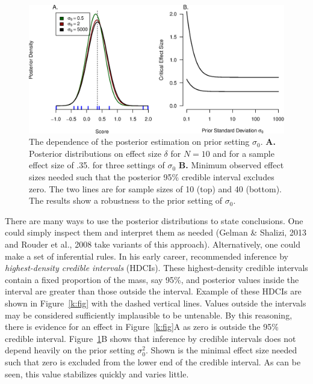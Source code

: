 \begin{figure}
\includegraphics[width=\textwidth]{figs/bi4_fig2}
\caption{The dependence of the posterior estimation on prior setting $\sigma_0$.  \textbf{A.} Posterior distributions on effect size $\delta$ for $N=10$ and for a sample effect size of .35. for three settings of $\sigma_0$ \textbf{B.} Minimum observed effect sizes needed such that the posterior 95\% credible interval excludes zero.  The two lines are for sample sizes of 10 (top) and 40 (bottom).  The results show a robustness to the prior setting of $\sigma_0$. }
\label{sig0}
\end{figure}

There are many ways to use the posterior distributions to state conclusions.  One could simply inspect them and interpret them as needed (Gelman \& Shalizi, 2013 and Rouder et al., 2008 take variants of this approach). \nocite{Rouder:etal:2008d,Gelman:Shalizi:2013} Alternatively, one could make a set of inferential rules.  In his early career,  recommended inference by {\em highest-density credible intervals} (HDCIs).  These highest-density credible intervals  contain a fixed proportion of the mass, say 95\%, and posterior values inside the interval are greater than those outside the interval.  
Example of these HDCIs are shown in Figure~\ref{k:fig} with the dashed vertical lines.  Values outside the intervals may be considered sufficiently implausible to be untenable.  By this reasoning, there is evidence for an effect in Figure~\ref{k:fig}A as zero is outside the 95\% credible interval.  Figure~\ref{sig0}B shows that inference by credible intervals does not depend heavily on the prior setting $\sigma_0^2$.  Shown is the minimal effect size needed such that zero is excluded from the lower end of the credible interval.  As can be seen, this value stabilizes quickly and varies little.   

